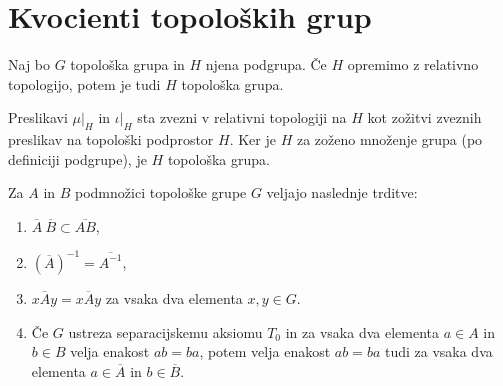 \documentclass[mat1]{fmfdelo}
\newcommand{\closure}[1]{\overline{#1}}
\begin{document}
\section{Kvocienti topoloških grup}

\begin{trditev}\label{trd:toppodgrupa}
Naj bo $G$ topološka grupa in $H$ njena podgrupa. Če $H$ opremimo z relativno topologijo, potem je tudi $H$ topološka grupa.
\end{trditev}

\begin{dokaz}
Preslikavi $\mu|_H$ in $\iota|_H$ sta zvezni v relativni topologiji na $H$ kot zožitvi zveznih preslikav na topološki podprostor $H$. Ker je $H$ za zoženo množenje grupa (po definiciji podgrupe), je $H$ topološka grupa.
\end{dokaz}

\begin{trditev}\label{trd:zaprtost}
Za $A$ in $B$ podmnožici topološke grupe $G$ veljajo naslednje trditve:
\begin{enumerate}
\item $\closure{A}\ \closure{B} \subset \closure{A B}$,
\item $(\closure{A})^{-1} = \closure{A^{-1}}$,
\item $x \closure{A} y = \closure{x A y}$ za vsaka dva elementa $x, y \in G$.

\item Če $G$ ustreza separacijskemu aksiomu $T_0$ in za vsaka dva elementa $a \in A$ in $b \in B$ velja enakost $ab = ba$, potem velja enakost $ab = ba$ tudi za vsaka dva elementa $a \in \closure{A}$ in $b \in \closure{B}$.
\end{enumerate}
\end{trditev}
\end{document}
